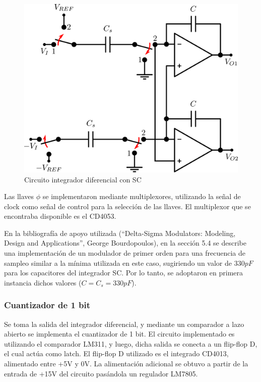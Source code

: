 \documentclass[assd_tp3_main.tex]{subfiles}
\begin{document}
\begin{figure}[!ht]
\begin{centering}
\includegraphics[scale=0.45]{images/ej5/IntegradorDifSC.png}
\par\end{centering}
\caption{Circuito integrador diferencial con SC}
\end{figure}

Las llaves $\phi$ se implementaron mediante multiplexores, utilizando la señal de clock como señal de control para la selección de las llaves. El multiplexor que se encontraba disponible es el CD4053.\par
En la bibliografía de apoyo utilizada (``Delta-Sigma Modulators: Modeling, Design and Applications'', George Bourdopoulos), en la sección 5.4 se describe una implementación de un modulador de primer orden para una frecuencia de sampleo similar a la mínima utilizada en este caso, sugiriendo un valor de $330pF$ para los capacitores del integrador SC. Por lo tanto, se adoptaron en primera instancia dichos valores ($C = C_s = 330pF$).

\subsubsection{Cuantizador de 1 bit}

Se toma la salida del integrador diferencial, y mediante un comparador a lazo abierto se implementa el cuantizador de 1 bit. El circuito implementado es utilizando el comparador LM311, y luego, dicha salida se conecta a un flip-flop D, el cual actúa como latch. El flip-flop D utilizado es el integrado CD4013, alimentado entre +5V y 0V. La alimentación adicional se obtuvo a partir de la entrada de +15V del circuito pasándola un regulador LM7805.
\end{document}
